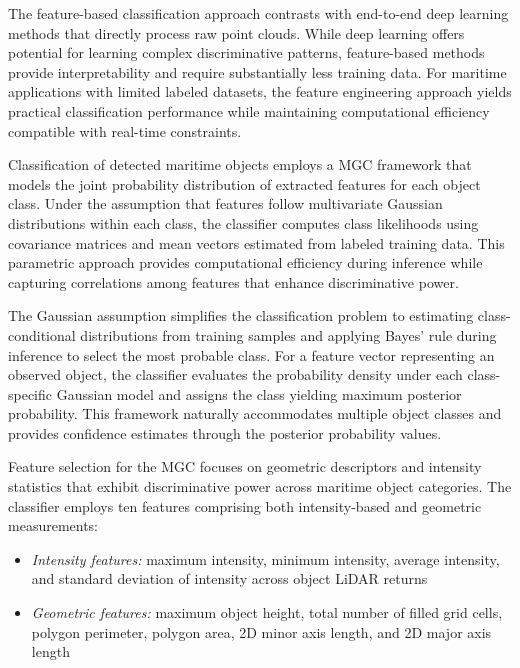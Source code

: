 \documentclass{erauthesis}
\begin{document}
The feature-based classification approach contrasts with end-to-end deep learning methods that directly process raw point clouds.
While deep learning offers potential for learning complex discriminative patterns, feature-based methods provide interpretability and require substantially less training data.
For maritime applications with limited labeled datasets, the feature engineering approach yields practical classification performance while maintaining computational efficiency compatible with real-time constraints.

Classification of detected maritime objects employs a \ac{MGC} framework that models the joint probability distribution of extracted features for each object class.
Under the assumption that features follow multivariate Gaussian distributions within each class, the classifier computes class likelihoods using covariance matrices and mean vectors estimated from labeled training data.
This parametric approach provides computational efficiency during inference while capturing correlations among features that enhance discriminative power.

The Gaussian assumption simplifies the classification problem to estimating class-conditional distributions from training samples and applying Bayes' rule during inference to select the most probable class.
For a feature vector representing an observed object, the classifier evaluates the probability density under each class-specific Gaussian model and assigns the class yielding maximum posterior probability.
This framework naturally accommodates multiple object classes and provides confidence estimates through the posterior probability values.

Feature selection for the \ac{MGC} focuses on geometric descriptors and intensity statistics that exhibit discriminative power across maritime object categories.
The classifier employs ten features comprising both intensity-based and geometric measurements:

\begin{itemize}
    \item \textit{Intensity features:} maximum intensity, minimum intensity, average intensity, and standard deviation of intensity across object \ac{LiDAR} returns
    \item \textit{Geometric features:} maximum object height, total number of filled grid cells, polygon perimeter, polygon area, 2D minor axis length, and 2D major axis length
\end{itemize}
\end{document}
